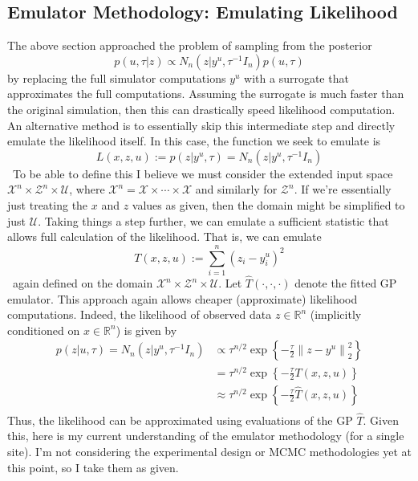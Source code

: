 \documentclass[12pt]{article}
\newcommand*{\norm}[1]{\left\lVert#1\right\rVert}
\newcommand{\R}{\mathcal{R}}
\def\R{\mathbb{R}}
\begin{document}
\subsection{Emulator Methodology: Emulating Likelihood}
The above section approached the problem of sampling from the posterior
\[p(u, \tau|z) \propto N_n(z|y^u, \tau^{-1} I_n)p(u, \tau)\]
by replacing the full simulator computations $y^u$ with a surrogate that approximates the full computations. Assuming the surrogate is much faster than the original simulation, then 
this can drastically speed likelihood computation. An alternative method is to essentially skip this intermediate step and directly emulate the likelihood itself. In this case, the function 
we seek to emulate is
\[L(x, z, u) := p(z|y^{u}, \tau) = N_n(z|y^{u}, \tau^{-1} I_n)\]\
To be able to  define this I believe we must consider the extended input space $\mathcal{X}^n \times \mathcal{Z}^n \times \mathcal{U}$, where $\mathcal{X}^n = \mathcal{X} \times \cdots \times \mathcal{X}$
and similarly for $\mathcal{Z}^n$. If we're essentially just treating the $x$ and $z$ values as given, then the domain might be simplified to just $\mathcal{U}$. 
Taking things a step further, we can emulate a sufficient statistic that allows full calculation of the likelihood. That is, we can emulate
\[T(x, z, u) := \sum_{i = 1}^n (z_i - y_i^{u})^2\]\
again defined on the domain $\mathcal{X}^n \times \mathcal{Z}^n \times \mathcal{U}$. Let $\hat{T}(\cdot, \cdot, \cdot)$ denote the fitted GP emulator. 
This approach again allows cheaper (approximate) likelihood computations. Indeed, the likelihood of observed data $z \in \R^n$ (implicitly conditioned on $x \in \R^n$) is given by  
\begin{align*}
p(z|u, \tau) = N_n(z|y^u, \tau^{-1}I_n) &\propto \tau^{n/2} \exp\left\{-\frac{\tau}{2} \norm{z - y^u}^2_2 \right\} \\
					         &= \tau^{n/2} \exp\left\{-\frac{\tau}{2} T(x, z, u) \right\} \\
					         &\approx \tau^{n/2} \exp\left\{-\frac{\tau}{2} \hat{T}(x, z, u) \right\} \\
\end{align*}
Thus, the likelihood can be approximated using evaluations of the GP $\hat{T}$. 
Given this, here is my current understanding of the emulator methodology (for a single site). I'm not considering the experimental design or MCMC methodologies yet at this point, so 
I take them as given. 
\end{document}

